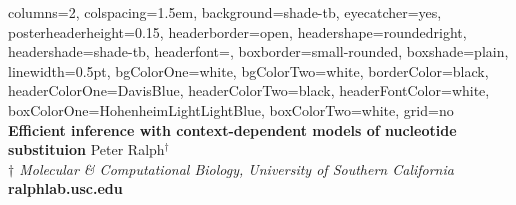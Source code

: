 \documentclass[fontscale=0.38]{baposter}
\begin{document}
\newlength{\leftimgwidth}
\begin{poster}%
  {
  columns=2,
  colspacing=1.5em,
  background=shade-tb,
  eyecatcher=yes,
  posterheaderheight=0.15\textheight,
  headerborder=open,
  headershape=roundedright,
  headershade=shade-tb,
  headerfont=\Large\textsf, %
  boxborder=small-rounded,
  boxshade=plain,
  linewidth=0.5pt,
  bgColorOne=white,
  bgColorTwo=white,
  borderColor=black,
  headerColorOne=DavisBlue,
  headerColorTwo=black,
  headerFontColor=white,
  boxColorOne=HohenheimLightLightBlue,
  boxColorTwo=white,
  grid=no
  }
  {
  \makebox[10em][r]{%
    \begin{minipage}{10em}
       \hfill
    \end{minipage}
    }
  }
  {\sf %
  \vspace{0.5em}
  \textbf{\textcolor{DavisBlue}{Efficient inference with context-dependent models of nucleotide substituion}}\vspace{0.5em}}
  {\sf %
    Peter Ralph$^{\dagger}$ \\  \vspace{-1.0mm}
    {\small \textit{$\dagger$ Molecular \& Computational Biology, University of Southern California }}\\  
    {\small   \textbf{ralphlab.usc.edu}}\\
  }
  {
    \makebox[10em][r]{%
      \begin{minipage}{10em}
        \hfill
      \end{minipage}
    }
  }




\end{poster}
\end{document}
